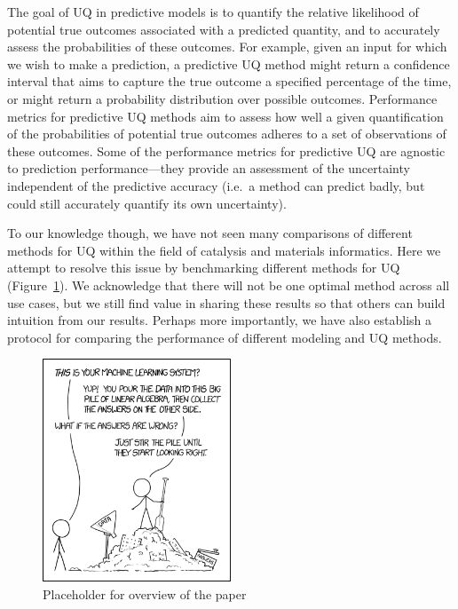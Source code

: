 \documentclass[]{achemso}
\begin{document}
The goal of \gls{UQ} in predictive models is to quantify the relative likelihood of potential true outcomes associated with a predicted quantity, and to accurately assess the probabilities of these outcomes.
For example, given an input for which we wish to make a prediction, a predictive \gls{UQ} method might return a confidence interval that aims to capture the true outcome a specified percentage of the time, or might return a probability distribution over possible outcomes.
Performance metrics for predictive \gls{UQ} methods aim to assess how well a given quantification of the probabilities of potential true outcomes adheres to a set of observations of these outcomes.
Some of the performance metrics for predictive \gls{UQ} are agnostic to prediction performance---they provide an assessment of the uncertainty independent of the predictive accuracy (i.e.\ a method can predict badly, but could still accurately quantify its own uncertainty).

To our knowledge though, we have not seen many comparisons of different methods for \gls{UQ} within the field of catalysis and materials informatics.
Here we attempt to resolve this issue by benchmarking different methods for \gls{UQ} (Figure~\ref{fig:overview}).
We acknowledge that there will not be one optimal method across all use cases, but we still find value in sharing these results so that others can build intuition from our results.
Perhaps more importantly, we have also establish a protocol for comparing the performance of different modeling and \gls{UQ} methods.

\begin{figure}
    \centering
    \includegraphics[width=0.5\textwidth]{placeholder.png}
    \caption{Placeholder for overview of the paper}\label{fig:overview}
\end{figure}
\end{document}
